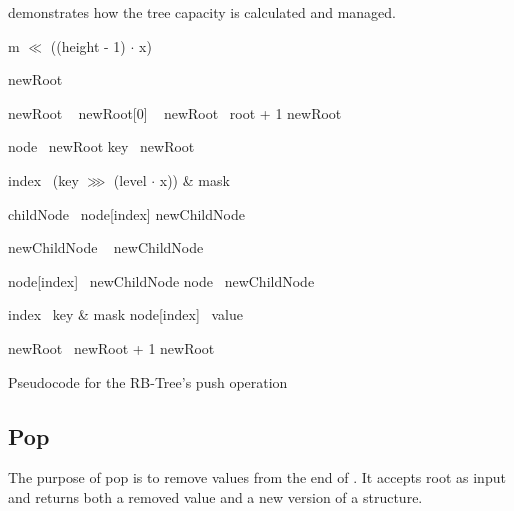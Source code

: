  demonstrates how the tree capacity is calculated and managed.

\begin{listing}[ht!]
    \begin{algorithmic}[1]
		    \State \Return m $\ll$ ((height - 1) $\cdot$ x)
        \EndFunction

            \State newRoot \la\ \nil{}

                \State newRoot \la\ 
                \State newRoot[0] \la\ 
                \State newRoot \la\ root + 1
            \Else
                \State newRoot \la\ 
            \EndIf

            \State node \la\ newRoot
            \State key \la\ newRoot

                \State index \la\ (key $\ggg$ (level $\cdot$ x)) \& mask

                \State childNode \la\ node[index]
                \State newChildNode \la\ \nil{}

                    \State newChildNode \la\ 
                \Else
                    \State newChildNode \la\ 
                \EndIf

                \State node[index] \la\ newChildNode
                \State node \la\ newChildNode
            \EndFor

            \State index \la\ key \& mask
            \State node[index] \la\ value

            \State newRoot \la\ newRoot + 1
            \State \Return newRoot
        \EndFunction
    \end{algorithmic}

    \caption{Pseudocode for the RB-Tree's push operation}
    \label{lst:rb-tree-push}
\end{listing}

\subsection{Pop}
The purpose of pop is to remove values from the end of \treerb{}. It accepts root as input and returns both a removed value and a new version of a structure.

